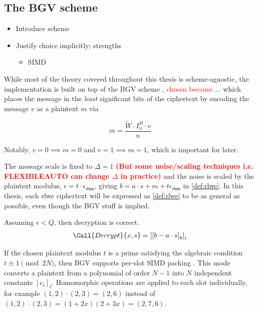\subsection{The BGV scheme}
\begin{itemize}
    \item Introduce scheme \cite{cryptoeprint:2011/277}
    \item Justify choice implicitly; strengths
    \begin{itemize}
        \item SIMD
    \end{itemize}
\end{itemize}
While most of the theory covered throughout this thesis is scheme-agnostic, the implementation is built on top of the BGV scheme \cite{cryptoeprint:2011/277}, \textcolor{red}{chosen because} ... which places the message in the \textit{least} significant bits of the ciphertext by encoding the message $v$ as a plaintext $m$ via

\begin{equation}
    m = \frac{\tilde{W}\cdot I_n^R \cdot v}{n}
\end{equation}

Notably, $v = 0 \implies m  = 0$ and $v = 1 \implies m = 1$, which is important for later.

The message scale is fixed to $\Delta = 1$ \textcolor{red}{\textbf{(But some noise/scaling techniques i.e. FLEXIBLEAUTO can change $\Delta$ in practice)}} and the noise is scaled by the plaintext modulus, $\epsilon = t\cdot \epsilon_{\mathsf{rlwe}}$, giving $b = a\cdot s + m + t\epsilon_{\mathsf{rlwe}}$ in \eqref{def:rlwe}. In this thesis, each \gls{rlwe} ciphertext will be expressed as \eqref{def:rlwe} to be as general as possible, even though the BGV stuff is implied.

\begin{definition}[Decryption]
    Assuming $\epsilon < Q$, then decryption is correct.
    \begin{equation}
        \Call{Decrypt}{x, s} = \left[[b - a\cdot s]_q\right]_t
    \end{equation}
\end{definition}

\begin{definition} 
    If the chosen plaintext modulus $t$ is a prime satisfying the algebraic condition $t \equiv 1 \pmod{2N}$, then BGV supports per-slot SIMD packing \cite{cryptoeprint:2011/133}. This mode converts a plaintext from a polynomial of order $N - 1$ into $N$ independent constants $[c_i]_t$. Homomorphic operations are applied to each slot individually, for example $(1, 2) \cdot (2, 3) = (2, 6)$ instead of $(1, 2) \cdot (2, 3) = (1 + 2x)(2 + 3x) = (2, 7, 6)$.
\end{definition}